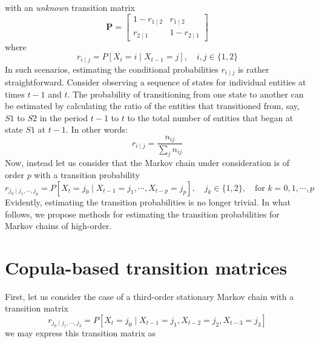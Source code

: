 \documentclass[harvard,11pt]{article}
\begin{document}
\begin{center}
\end{center}
with an \textit{unknown} transition matrix 
\[
\mathbf{P}=
\begin{bmatrix}
1-r_{1\mid2}&r_{1\mid2}\\
r_{2\mid1}&1-r_{2\mid1}
\end{bmatrix}
\]
where
\begin{equation}\label{eq: transition prob}
r_{i\mid j}=P[X_t=i \mid X_{t-1}=j],\quad i,j\in\{1,2\}
\end{equation}
In such scenarios, estimating the conditional probabilities $r_{i\mid j}$ is rather straightforward. Consider observing a sequence of states for individual entities at times $t-1$ and $t$. The probability of transitioning from one state to another can be estimated by calculating the ratio of the entities that transitioned from, say, $S1$ to $S2$ in the period $t-1$ to $t$ to the total number of entities that began at state $S1$ at $t-1$. In other words:
\begin{equation}\label{eq: ratio}
r_{i\mid j}=\frac{n_{ij}}{\sum_{j}n_{ij}}
\end{equation}  	  
Now, instead let us consider that the Markov chain under consideration is of order $p$ with a transition probability  
\begin{equation}\label{eq: transition prob}
r_{j_0\mid j_1,\cdots, j_p}=P[X_t=j_0 \mid X_{t-1}=j_1,\cdots,X_{t-p}=j_p],\quad j_k\in\{1,2\},\quad\text{for }k=0,1,\cdots,p
\end{equation} 
Evidently, estimating the transition probabilities is no longer trivial. In what follows, we propose methods for estimating the transition probabilities for Markov chains of high-order.   

\section{Copula-based transition matrices \label{Copula-based estimator of transition matrices}}
First, let us consider the case of a third-order stationary Markov chain with a transition matrix
\[
r_{j_0\mid j_1,\cdots,j_3}=P[X_t=j_0\mid X_{t-1}=j_1,X_{t-2}=j_2,X_{t-3}=j_3]
\]
we may express this transition matrix as
\end{document}
